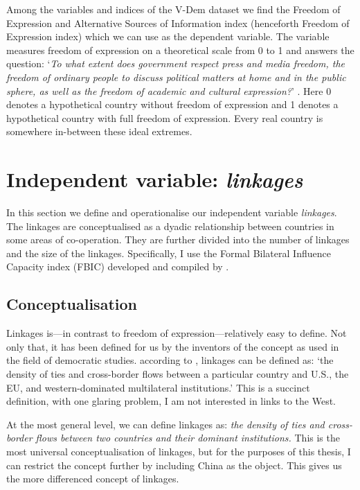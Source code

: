 Among the variables and indices of the V-Dem dataset we find the Freedom of Expression and Alternative Sources of Information index (henceforth Freedom of Expression index) which we can use as the dependent variable. The variable measures freedom of expression on a theoretical scale from 0 to 1 and answers the question: `\textit{To what extent does government respect press and media freedom, the freedom of ordinary people to discuss political matters at home and in the public sphere, as well as the freedom of academic and cultural expression?}' \citep[pp. 50-51]{coppedge_v-dem_2024-1}. Here 0 denotes a hypothetical country without freedom of expression and 1 denotes a hypothetical country with full freedom of expression. Every real country is somewhere in-between these ideal extremes.

\section{Independent variable: \textit{linkages}}
In this section we define and operationalise our independent variable \textit{linkages}. The linkages are conceptualised as a dyadic relationship between countries in some areas of co-operation. They are further divided into the number of linkages and the size of the linkages. Specifically, I use the Formal Bilateral Influence Capacity index (FBIC) developed and compiled by \citet{moyer_china-us_2021}.

\subsection{Conceptualisation}
Linkages is---in contrast to freedom of expression---relatively easy to define. Not only that, it has been defined for us by the inventors of the concept as used in the field of democratic studies. according to \citet[pp. 383-384]{levitsky_linkage_2006}, linkages can be defined as: `the density of ties and cross-border flows between a particular country and U.S., the EU, and western-dominated multilateral institutions.' \citep[p. 383]{levitsky_linkage_2006} This is a succinct definition, with one glaring problem, I am not interested in links to the West. 

At the most general level, we can define linkages as: \textit{the density of ties and cross-border flows between two countries and their dominant institutions.} This is the most universal conceptualisation of linkages, but for the purposes of this thesis, I can restrict the concept further by including China as the object. This gives us the more differenced concept of linkages.

